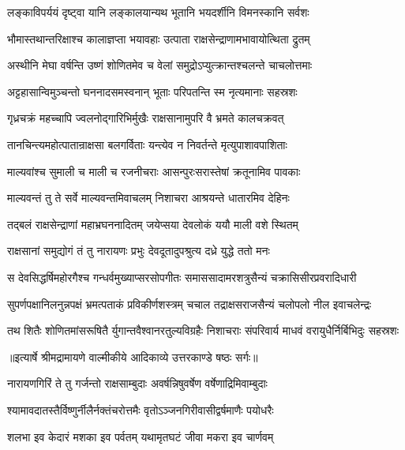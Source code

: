 \twolineshloka
{लङ्काविपर्ययं दृष्ट्वा यानि लङ्कालयान्यथ}
{भूतानि भयदर्शीनि विमनस्कानि सर्वशः} %

\twolineshloka
{भौमास्तथान्तरिक्षाश्च कालाज्ञप्ता भयावहाः}
{उत्पाता राक्षसेन्द्राणामभावायोत्थिता द्रुतम्} %

\twolineshloka
{अस्थीनि मेघा वर्षन्ति उष्णं शोणितमेव च}
{वेलां समुद्रोऽप्युत्क्रान्तश्चलन्ते चाचलोत्तमाः} %

\twolineshloka
{अट्टहासान्विमुञ्चन्तो घननादसमस्वनान्}
{भूताः परिपतन्ति स्म नृत्यमानाः सहस्रशः} %

\twolineshloka
{गृध्रचक्रं महच्चापि ज्वलनोद्गारिभिर्मुखैः}
{राक्षसानामुपरि वै भ्रमते कालचक्रवत्} %

\twolineshloka
{तानचिन्त्यमहोत्पातान्राक्षसा बलगर्विताः}
{यन्त्येव न निवर्तन्ते मृत्युपाशावपाशिताः} %

\twolineshloka
{माल्यवांश्च सुमाली च माली च रजनीचराः}
{आसन्पुरःसरास्तेषां क्रतूनामिव पावकाः} %

\twolineshloka
{माल्यवन्तं तु ते सर्वे माल्यवन्तमिवाचलम्}
{निशाचरा आश्रयन्ते धातारमिव देहिनः} %

\twolineshloka
{तद्बलं राक्षसेन्द्राणां महाभ्रघननादितम्}
{जयेप्सया देवलोकं ययौ माली वशे स्थितम्} %

\twolineshloka
{राक्षसानां समुद्योगं तं तु नारायणः प्रभुः}
{देवदूतादुपश्रुत्य दध्रे युद्धे ततो मनः} %

\fourlineindentedshloka
{स देवसिद्धर्षिमहोरगैश्च}
{ गन्धर्वमुख्याप्सरसोपगीतः}
{समाससादामरशत्रुसैन्यं}
{ चक्रासिसीरप्रवरादिधारी} %

\fourlineindentedshloka
{सुपर्णपक्षानिलनुन्नपक्षं}
{ भ्रमत्पताकं प्रविकीर्णशस्त्रम्}
{चचाल तद्राक्षसराजसैन्यं}
{ चलोपलो नील इवाचलेन्द्रः} %

\fourlineindentedshloka
{तथ शितैः शोणितमांसरूषितै}
{र्युगान्तवैश्वानरतुल्यविग्रहैः}
{निशाचराः संपरिवार्य माधवं}
{ वरायुधैर्निर्बिभिदुः सहस्रशः} %


{॥इत्यार्षे श्रीमद्रामायणे वाल्मीकीये आदिकाव्ये उत्तरकाण्डे षष्ठः सर्गः॥}


\twolineshloka
{नारायणगिरिं ते तु गर्जन्तो राक्षसाम्बुदाः}
{अवर्षन्निषुवर्षेण वर्षेणाद्रिमिवाम्बुदाः} %

\twolineshloka
{श्यामावदातस्तैर्विष्णुर्नीलैर्नक्तंचरोत्तमैः}
{वृतोऽञ्जनगिरीवासीद्वर्षमाणैः पयोधरैः} %

\twolineshloka
{शलभा इव केदारं मशका इव पर्वतम्}
{यथामृतघटं जीवा मकरा इव चार्णवम्} %

